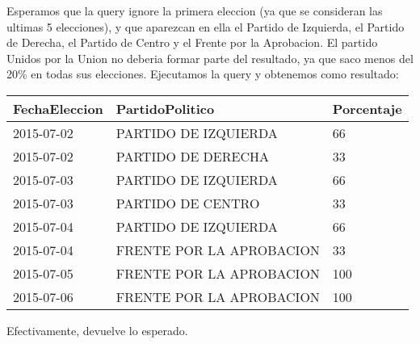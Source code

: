 \begin{itemize}
\begin{enumerate}
\end{enumerate}

Esperamos que la query ignore la primera eleccion (ya que se consideran las ultimas 5 elecciones), y que aparezcan en ella el Partido de Izquierda, el Partido de Derecha, el Partido de Centro y el Frente por la Aprobacion. El partido Unidos por la Union no deberia formar parte del resultado, ya que saco menos del 20\% en todas sus elecciones. Ejecutamos la query y obtenemos como resultado:



 \begin{tabular}{| l| l| l|}
	\hline 
	    FechaEleccion & PartidoPolitico & Porcentaje \\
	  \hline 
	   2015-07-02 &PARTIDO DE IZQUIERDA & 66 \\
	   \hline 
	   2015-07-02 &PARTIDO DE DERECHA  & 33 \\
	   \hline 
	   2015-07-03 &PARTIDO DE IZQUIERDA  & 66 \\
	   \hline 
	  2015-07-03  & PARTIDO DE CENTRO  & 33\\
	   \hline 
	   2015-07-04  & PARTIDO DE IZQUIERDA  & 66\\
	   \hline 
	   2015-07-04 &FRENTE POR LA APROBACION & 33 \\
	   \hline 
	   2015-07-05 &FRENTE POR LA APROBACION & 100 \\
	   \hline 
	   2015-07-06  & FRENTE POR LA APROBACION &100 \\
	   \hline 
	\end{tabular}

Efectivamente, devuelve lo esperado.

\end{itemize}